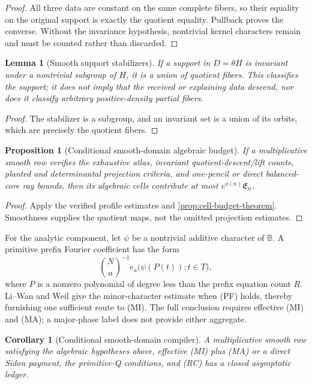 \documentclass[12pt,a4paper]{amsart}
\numberwithin{equation}{section}
\newtheorem{proposition}[proposition]{Proposition}
\newtheorem{lemma}[lemma]{Lemma}
\newtheorem{corollary}[corollary]{Corollary}
\theoremstyle{remark}
\newcommand{\B}{\mathbb B}
\begin{document}
\begin{proof}
All three data are constant on the same complete fibers, so their equality
on the original support is exactly the quotient equality.  Pullback proves
the converse.  Without the invariance hypothesis, nontrivial kernel
characters remain and must be counted rather than discarded.
\end{proof}

\begin{lemma}[Smooth support stabilizers]\label{lem:smooth-stabilizer-exhaustion}
If a support in \(D=\theta H\) is invariant under a nontrivial subgroup of
\(H\), it is a union of quotient fibers.  This classifies the support; it
does not imply that the received or explaining data descend, nor does it
classify arbitrary positive-density partial fibers.
\end{lemma}

\begin{proof}
The stabilizer is a subgroup, and an invariant set is a union of its
orbits, which are precisely the quotient fibers.
\end{proof}

\begin{proposition}[Conditional smooth-domain algebraic budget]\label{prop:smooth-domain-algebraic-closure}
If a multiplicative smooth row verifies the exhaustive atlas, invariant
quotient-descent/lift counts, planted and determinantal projection criteria, and
one-pencil or direct balanced-core ray bounds, then its algebraic cells
contribute at most \(e^{o(n)}\mathfrak E_n\).
\end{proposition}

\begin{proof}
Apply the verified profile estimates and
\cref{prop:cell-budget-theorem}.  Smoothness supplies the quotient maps,
not the omitted projection estimates.
\end{proof}

For the analytic component, let \(\psi\) be a nontrivial additive character of \(\B\).  A primitive prefix Fourier coefficient has the form
\[
       \binom Na^{-1}e_a\bigl(\psi(P(t)):t\in T\bigr),
\]
where \(P\) is a nonzero polynomial of degree less than the prefix
equation count \(R\).
Li--Wan and Weil give the minor-character estimate when \textup{(PF)}
holds, thereby furnishing one sufficient route to \textup{(MI)}.  The
full conclusion requires effective \textup{(MI)} and \textup{(MA)}; a
major-phase label does not provide either aggregate.

\begin{corollary}[Conditional smooth-domain compiler]\label{cor:smooth-domain-full-ledger}
A multiplicative smooth row satisfying the algebraic hypotheses above,
effective \textup{(MI)} plus \textup{(MA)} or a direct Sidon payment, the primitive-Q
conditions, and \textup{(RC)} has a closed asymptotic ledger.
\end{corollary}
\end{document}
